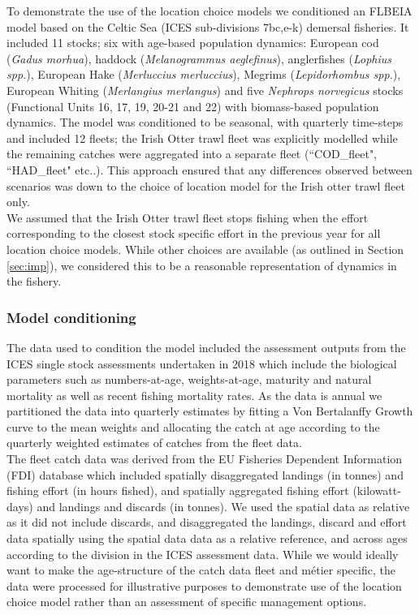 \documentclass[12pt, halfline, a4paper]{ouparticle}
\begin{document}
To demonstrate the use of the location choice models we conditioned an FLBEIA
model based on the Celtic Sea (ICES sub-divisions 7bc,e-k) demersal fisheries.
It included 11 stocks; six with age-based population dynamics: European cod
(\textit{Gadus morhua}), haddock (\textit{Melanogrammus aeglefinus}),
anglerfishes (\textit{Lophius spp.}), European Hake (\textit{Merluccius
	merluccius}), Megrims (\textit{Lepidorhombus spp.}), European Whiting
(\textit{Merlangius merlangus}) and five \textit{Nephrops norvegicus} stocks
(Functional Units 16, 17, 19, 20-21 and 22) with biomass-based population
dynamics. The model was conditioned to be seasonal, with quarterly time-steps
and included 12 fleets; the Irish Otter trawl fleet was explicitly modelled
while the remaining catches were aggregated into a separate fleet
(``COD\_fleet", ``HAD\_fleet" etc..). This approach ensured that any
differences observed between scenarios was down to the choice of location model
for the Irish otter trawl fleet only. \\

We assumed that the Irish Otter trawl fleet stops fishing when the effort
corresponding to the closest stock specific effort in the previous year for all
location choice models. While other choices are available (as outlined in
Section \ref{sec:imp}), we considered this to be a reasonable representation of
dynamics in the fishery. 

\subsubsection{Model conditioning}

The data used to condition the model included the assessment outputs from the
ICES single stock assessments undertaken in 2018 \citep{ICES2018} which include
the biological parameters such as numbers-at-age, weights-at-age, maturity and
natural mortality as well as recent fishing mortality rates. As the data is
annual we partitioned the data into quarterly estimates by fitting a Von
Bertalanffy Growth curve to the mean weights and allocating the catch at age
according to the quarterly weighted estimates of catches from the fleet data.
\\

The fleet catch data was derived from the EU Fisheries Dependent Information
(FDI) database \citep{STECF2017} which included spatially disaggregated
landings (in tonnes) and fishing effort (in hours fished), and spatially
aggregated fishing effort (kilowatt-days) and landings and discards (in
tonnes). We used the spatial data as relative as it did not include discards,
and disaggregated the landings, discard and effort data spatially using the
spatial data data as a relative reference, and across ages according to the
division in the ICES assessment data. While we would ideally want to make the
age-structure of the catch data fleet and métier specific, the data were
processed for illustrative purposes to demonstrate use of the location choice
model rather than an assessment of specific management options. \\
\end{document}
